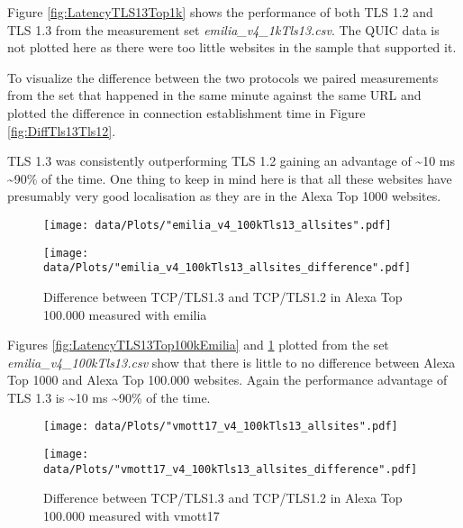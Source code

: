 Figure \ref{fig:LatencyTLS13Top1k} shows the performance of both TLS 1.2 and TLS 1.3 from the measurement set \textit{emilia\_v4\_1kTls13.csv}.
The QUIC data is not plotted here as there were too little websites in the sample that supported it.

To visualize the difference between the two protocols we paired measurements from the set that happened in the same minute against the same URL and plotted the difference in connection establishment time in Figure \ref{fig:DiffTls13Tls12}.

TLS 1.3 was consistently outperforming TLS 1.2 gaining an advantage of \textasciitilde 10 ms \textasciitilde 90\% of the time.
One thing to keep in mind here is that all these websites have presumably very good localisation as they are in the Alexa Top 1000 websites. \\

\begin{figure}[!thb]
	\centering
	\begin{minipage}{.45\textwidth}
		\centering
		\texttt{[image: data/Plots/"emilia\_v4\_100kTls13\_allsites".pdf]}
		\caption{Latency of 15981 sites in Alexa Top 100.000 that support TLS 1.3 measured with emilia}
  		\label{fig:LatencyTLS13Top100kEmilia}
  	\end{minipage}%
  	\hspace{0.5cm}
  	\begin{minipage}{.45\textwidth}
  		\centering
  		\texttt{[image: data/Plots/"emilia\_v4\_100kTls13\_allsites\_difference".pdf]}
		\caption{Difference between TCP/TLS1.3 and TCP/TLS1.2 in Alexa Top 100.000 measured with emilia}
  		\label{fig:DiffTls13Tls12Top100kEmilia}
  	\end{minipage}
\end{figure}

Figures \ref{fig:LatencyTLS13Top100kEmilia} and \ref{fig:DiffTls13Tls12Top100kEmilia} plotted from the set \textit{emilia\_v4\_100kTls13.csv} show that there is little to no difference between Alexa Top 1000 and Alexa Top 100.000 websites.
Again the performance advantage of TLS 1.3 is \textasciitilde 10 ms \textasciitilde 90\% of the time.


\begin{figure}[!thb]
	\centering
	\begin{minipage}{.45\textwidth}
		\centering
		\texttt{[image: data/Plots/"vmott17\_v4\_100kTls13\_allsites".pdf]}
		\caption{Latency of 15981 sites in Alexa Top 100.000 that support TLS 1.3 measured with vmott17}
  		\label{fig:LatencyTLS13Top100kVmott17}
  	\end{minipage}%
  	\hspace{0.5cm}
  	\begin{minipage}{.45\textwidth}
  		\centering
  		\texttt{[image: data/Plots/"vmott17\_v4\_100kTls13\_allsites\_difference".pdf]}
		\caption{Difference between TCP/TLS1.3 and TCP/TLS1.2 in Alexa Top 100.000 measured with vmott17}
  		\label{fig:DiffTls13Tls12Top100kVmott17}
  	\end{minipage}
\end{figure}

